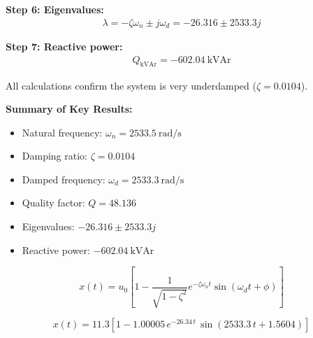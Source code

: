 \documentclass{article}
\begin{document}
\textbf{Step 6: Eigenvalues:}
\begin{align*}
    \lambda = -\zeta \omega_n \pm j \omega_d = -26.316 \pm 2533.3j
\end{align*}

\textbf{Step 7: Reactive power:}
\begin{align*}
    Q_{\text{kVAr}} = -602.04~\text{kVAr}
\end{align*}

All calculations confirm the system is very underdamped ($\zeta = 0.0104$).

\vspace{1em}
\textbf{Summary of Key Results:}
\begin{itemize}
    \item Natural frequency: $\boxed{\omega_n = 2533.5~\text{rad/s}}$
    \item Damping ratio: $\boxed{\zeta = 0.0104}$
    \item Damped frequency: $\boxed{\omega_d = 2533.3~\text{rad/s}}$
    \item Quality factor: $\boxed{Q = 48.136}$
    \item Eigenvalues: $\boxed{-26.316 \pm 2533.3j}$
    \item Reactive power: $\boxed{-602.04~\text{kVAr}}$
\end{itemize}

\[
\boxed{
  x(t) = u_0 \left[1 - \frac{1}{\sqrt{1-\zeta^2}} e^{-\zeta \omega_n t} \sin(\omega_d t + \phi)\right]
}
\]

\[
\boxed{
  x(t) = 11.3 \left[1 - 1.00005 \, e^{-26.34\, t} \, \sin(2533.3\, t + 1.5604)\right]
}
\]
\end{document}
